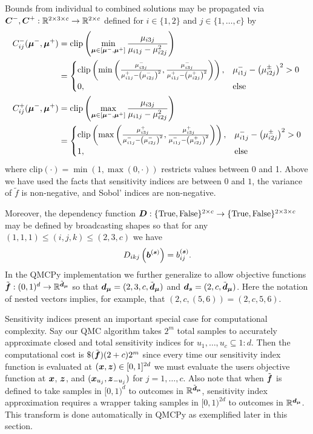 \documentclass{article}[12pt]
\begin{document}
Bounds from individual to combined solutions may be propagated via $\bC^-,\bC^+:\bbR^{2 \times 3 \times c} \to \bbR^{2 \times c}$ defined for $i \in \{1,2\}$ and $j \in \{1,\dots,c\}$  by  
\begin{align*}
    C_{ij}^-(\bmu^-,\bmu^+) 
    &= \text{clip}\left(\min_{\bmu \in [\bmu^-,\bmu^+]} \frac{\mu_{i3j}}{\mu_{i1j}-\mu_{i2j}^2}\right) \\
    &= \begin{cases} 
        \text{clip}\left(\min\left(\frac{\mu_{i3j}^-}{\mu_{i1j}^+-\left(\mu_{i2j}^-\right)^2},\frac{\mu_{i3j}^-}{\mu_{i1j}^+-\left(\mu_{i2j}^+\right)^2}\right)\right), & \mu_{i1j}^- - \left(\mu_{i2j}^\pm\right)^2 >0 \\
        0, &\text{else}
    \end{cases} \\
    C_{ij}^+(\bmu^-,\bmu^+) 
    &= \text{clip}\left(\max_{\bmu \in [\bmu^-,\bmu^+]} \frac{\mu_{i3j}}{\mu_{i1j}-\mu_{i2j}^2}\right) \\
    &= \begin{cases} 
        \text{clip}\left(\max\left(\frac{\mu_{i3j}^+}{\mu_{i1j}^--\left(\mu_{i2j}^-\right)^2},\frac{\mu_{i3j}^+}{\mu_{i1j}^--\left(\mu_{i2j}^+\right)^2}\right)\right), & \mu_{i1j}^- - \left(\mu_{i2j}^\pm\right)^2 >0 \\
        1, &\text{else}
    \end{cases}
\end{align*}
where $\text{clip}(\cdot) = \min(1,\max(0,\cdot))$ restricts values between 0 and 1. Above we have used the facts that sensitivity indices are between $0$ and $1$, the variance of $\tilde{f}$ is non-negative, and Sobol' indices are non-negative. 

Moreover, the dependency function $\bD:\tfset^{2 \times c} \to \tfset^{2 \times 3 \times c}$ may be defined by broadcasting shapes so that for any $(1,1,1) \leq (i,j,k) \leq (2,3,c)$ we have  $$D_{ikj}\left(\bb^{(\bs)}\right) = b_{ij}^{(\bs)}.$$
In the QMCPy implementation we further generalize to allow objective functions $\tilde{\bf}: (0,1)^{d} \to \bbR^{\tilde{\bd}_{\bmu}}$ so that $\bd_{\bmu} = (2,3,c,\tilde{\bd}_{\bmu})$ and $\bd_{\bs} = (2,c,\tilde{\bd}_{\bmu})$. Here the notation of nested vectors implies, for example, that  $(2,c,(5,6)) =(2,c,5,6)$.

Sensitivity indices present an important special case for computational complexity. Say our QMC algorithm takes $2^m$ total samples to accurately approximate closed and total sensitivity indices for $u_1,\dots,u_c \subseteq 1:d$. Then the computational cost is $\$(\tilde{\bf})(2+c)2^m$ since every time our sensitivity index function is evaluated at $(\bx,\bz) \in [0,1]^{2d}$ we must evaluate the users objective function at $\bx$, $\bz$, and $(\bx_{u_j},\bz_{-{u_j}})$ for $j=1,\dots,c$. Also note that when $\tilde{\bf}$ is defined to take samples in  $[0,1)^{d}$ to outcomes in $\bbR^{\tilde{\bd}_{\bmu}}$, sensitivity index approximation requires a wrapper taking samples in $[0,1)^{2d}$ to outcomes in $\bbR^{\bd_{\bmu}}$. This transform is done automatically in QMCPy as exemplified later in this section. 
\end{document}
